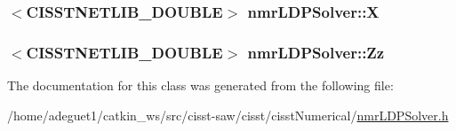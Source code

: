 \hypertarget{classnmr_l_d_p_solver_a5868c434e5fef304f43ea90e8202d897}{
\subsubsection[{X}]{$<$C\-I\-S\-S\-T\-N\-E\-T\-L\-I\-B\-\_\-\-D\-O\-U\-B\-L\-E$>$ nmr\-L\-D\-P\-Solver\-::\-X\hspace{0.3cm}{\ttfamily [protected]}}}\label{classnmr_l_d_p_solver_a5868c434e5fef304f43ea90e8202d897}
\hypertarget{classnmr_l_d_p_solver_ab8b43ef98ca002bfc8d3b6ad4e6ac654}{
\subsubsection[{Zz}]{$<$C\-I\-S\-S\-T\-N\-E\-T\-L\-I\-B\-\_\-\-D\-O\-U\-B\-L\-E$>$ nmr\-L\-D\-P\-Solver\-::\-Zz\hspace{0.3cm}{\ttfamily [protected]}}}\label{classnmr_l_d_p_solver_ab8b43ef98ca002bfc8d3b6ad4e6ac654}


The documentation for this class was generated from the following file\-:\begin{DoxyCompactItemize}
\item 
/home/adeguet1/catkin\-\_\-ws/src/cisst-\/saw/cisst/cisst\-Numerical/\hyperlink{nmr_l_d_p_solver_8h}{nmr\-L\-D\-P\-Solver.\-h}\end{DoxyCompactItemize}
